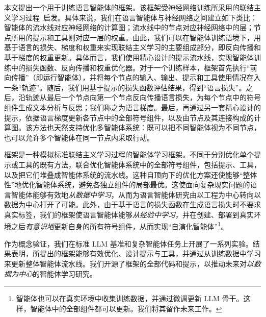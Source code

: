 本文提出一个用于训练语言智能体的\textit{\baby}框架。该框架受神经网络训练所采用的联结主义学习过程~\citep{hinton1990connectionist}启发。具体来说，我们在语言智能体与神经网络之间建立如下类比：智能体的流水线对应神经网络的计算图；流水线中的节点对应神经网络中的层；节点所用的提示和工具则对应一层的权重。由此，我们可以在智能体训练语境下，用基于语言的损失、梯度和权重来实现联结主义学习的主要组成部分，即反向传播和基于梯度的权重更新。具体而言，我们使用精心设计的提示流水线，实现智能体训练中的损失函数、反向传播和权重优化器。对于一个训练样本，框架首先执行“前向传播”（即运行智能体），并将每个节点的输入、输出、提示和工具使用情况存入一条“轨迹”。随后，我们用基于提示的损失函数评估结果，得到“语言损失”。之后，沿轨迹从最后一个节点向第一个节点反向传播语言损失，为每个节点中的符号组件生成文本分析与反思；我们称之为语言梯度。最后，再通过另一套精心设计的提示，依据语言梯度更新各节点中的全部符号组件，以及由节点及其连接构成的计算图。该方法也天然支持优化多智能体系统：既可以把不同智能体视为不同节点，也可以允许多个智能体在同一节点内采取行动。

\baby{}框架是一种模拟标准联结主义学习过程的智能体学习框架。不同于分别优化单个提示或工具的既有方法，\baby{}联合优化智能体系统中的全部符号组件，包括提示、工具，以及把它们堆叠成智能体系统的流水线。这种自顶向下的优化方案还使\baby{}能够“整体性”地优化智能体系统，避免各独立组件的局部最优。这使面向复杂现实问题的语言智能体能够有效地\textit{从数据中学习}，从而为语言智能体研究由以工程为中心转向以数据为中心打开了可能。此外，由于基于语言的损失函数在生成语言损失时不要求真实标签，我们的框架使语言智能体能够\textit{从经验中学习}，并在创建、部署到真实环境之后\textit{有意识地}更新自身的所有符号组件，从而实现“自演化智能体”\footnote{智能体也可以在真实环境中收集训练数据，并通过微调更新 LLM 骨干。这样，智能体中的全部组件都可以更新。我们将其留作未来工作。}。

作为概念验证，我们在标准 LLM 基准和复杂智能体任务上开展了一系列实验。结果表明，所提出的\baby{}框架能够有效优化、设计提示与工具，并通过从训练数据中学习来更新整体智能体流水线。我们开源了\baby{}框架的全部代码和提示，以推动未来对\textit{以数据为中心}的智能体学习研究。
